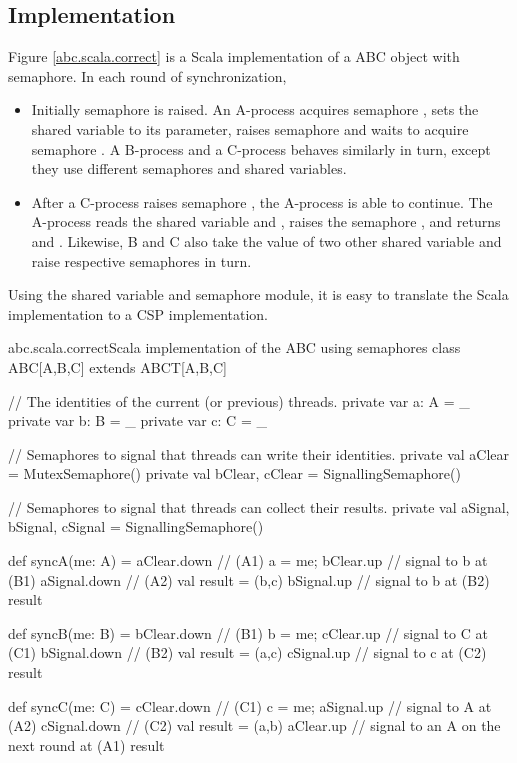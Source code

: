 \documentclass{article}
\begin{document}
\subsection{Implementation}
Figure \ref{abc.scala.correct} is a Scala implementation of a ABC object with semaphore. In each round of synchronization,
\begin{itemize}
    \item Initially semaphore  is raised. An A-process acquires semaphore , sets the shared variable  to its parameter, raises semaphore  and waits to acquire semaphore . A B-process and a C-process behaves similarly in turn, except they use different semaphores and shared variables. 
    \item After a C-process raises semaphore , the A-process is able to continue. The A-process reads the shared variable  and , raises the semaphore , and returns  and . Likewise, B and C also take the value of two other shared variable and raise respective semaphores in turn.
\end{itemize}

Using the shared variable and semaphore module, it is easy to translate the Scala implementation to a CSP implementation.

\begin{scalafloat}{abc.scala.correct}{Scala implementation of the ABC using semaphores}
class ABC[A,B,C] extends ABCT[A,B,C]{
  // The identities of the current (or previous) threads.
  private var a: A = _
  private var b: B = _
  private var c: C = _

  // Semaphores to signal that threads can write their identities.
  private val aClear = MutexSemaphore()
  private val bClear, cClear = SignallingSemaphore()

  // Semaphores to signal that threads can collect their results. 
  private val aSignal, bSignal, cSignal = SignallingSemaphore()

  def syncA(me: A) = {
    aClear.down         // (A1)
    a = me; bClear.up   // signal to b at (B1)
    aSignal.down        // (A2)
    val result = (b,c)
    bSignal.up          // signal to b at (B2)
    result
  }

  def syncB(me: B) = {
    bClear.down         // (B1)
    b = me; cClear.up   // signal to C at (C1)
    bSignal.down        // (B2)
    val result = (a,c)
    cSignal.up          // signal to c at (C2)
    result
  }

  def syncC(me: C) = {
    cClear.down         // (C1)
    c = me; aSignal.up  // signal to A at (A2)
    cSignal.down        // (C2)
    val result = (a,b)
    aClear.up           // signal to an A on the next round at (A1)
    result
  }
}      
\end{scalafloat}
\end{document}
